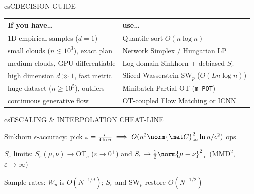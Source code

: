 \documentclass[../../../../master.tex]{subfiles}
\begin{document}
\begin{cscolumns}
\begin{cscard}{csC}{DECISION GUIDE}
  \renewcommand{\arraystretch}{1.18}\small
  \begin{tabular}{@{}>{\raggedright\arraybackslash}p{3.2cm}>{\raggedright\arraybackslash}p{4.7cm}@{}}
    \textbf{If you have\ldots} & \textbf{use\ldots}\\ \hline
    1D empirical samples ($d=1$) & Quantile sort $O(n\log n)$\\
    small clouds ($n\lesssim 10^3$), exact plan & Network Simplex / Hungarian LP\\
    medium clouds, GPU differentiable & Log-domain Sinkhorn + debiased $S_\varepsilon$\\
    high dimension $d\gg 1$, fast metric & Sliced Wasserstein $\mathrm{SW}_p$ ($O(Ln\log n)$)\\
    huge dataset ($n\ge 10^5$), outliers & Minibatch Partial OT (\texttt{m-POT})\\
    continuous generative flow & OT-coupled Flow Matching or ICNN\\
  \end{tabular}
\end{cscard}

\begin{cscard}{csE}{SCALING \& INTERPOLATION CHEAT-LINE}
  \begin{csbul}
    \item Sinkhorn $\epsilon$-accuracy: pick $\varepsilon=\frac{\epsilon}{4\ln n}\implies O(n^2\norm{\mat C}_\infty^2\ln n/\epsilon^2)$ ops
    \item $S_\varepsilon$ limits: $S_\varepsilon(\mu,\nu)\to\mathrm{OT}_c$ ($\varepsilon\to 0^+$) and $S_\varepsilon\to\frac12\norm{\mu-\nu}_{-c}^2$ ($\mathrm{MMD}^2$, $\varepsilon\to\infty$)
    \item Sample rates: $W_p$ is $O(N^{-1/d})$; $S_\varepsilon$ and $\mathrm{SW}_p$ restore $O(N^{-1/2})$
  \end{csbul}
\end{cscard}


\end{cscolumns}
\end{document}
